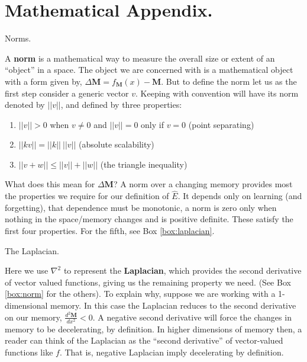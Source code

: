 \section*{Mathematical Appendix.}
\newcommand{\beginsupplement}{%
        \setcounter{table}{0}
        \renewcommand{\thetable}{S\arabic{table}}%
        \setcounter{figure}{0}
        \renewcommand{\thefigure}{S\arabic{figure}}%
     }
\beginsupplement
\setcounter{theorem}{0}

\begin{featurebox}
	\caption{Norms.}
	\label{box:norm}
	A \textbf{norm} is a mathematical way to measure the overall size or extent of an ``object'' in a space. The object we are concerned with is a mathematical object with a form given by, $\Delta \mathbf{M} = f_{\mathbf{M}}(x) - \mathbf{M}$. But to define the norm let us as the first step consider a generic vector $v$. Keeping with convention will have its norm denoted by $||v||$, and defined by three properties:
	
	\begin{enumerate}
	  \item $||v|| > 0$ when $v \neq 0$ and $||v|| = 0$ only if $v=0$ (point separating)
	  \item $||k v|| = ||k||\ ||v||$ (absolute scalability)
	  \item $||v + w|| \leq ||v|| + ||w||$ (the triangle inequality)
	\end{enumerate}
	
	What does this mean for $\Delta \mathbf{M}$? A norm over a changing memory provides most the properties we require for our definition of $\hat E$. It depends only on learning (and forgetting), that dependence must be monotonic, a norm is zero only when nothing in the space/memory changes and is positive definite. These satisfy the first four properties. For the fifth, see Box \ref{box:laplacian}.
	\medskip
	\end{featurebox}
	
	\begin{featurebox}
		\caption{The Laplacian.}
		\label{box:laplacian}
		Here we use $\nabla^2$ to represent the \textbf{Laplacian}, which provides the second derivative of vector valued functions, giving us the remaining property we need. (See Box \ref{box:norm} for the others). To explain why, suppose we are working with a 1- dimensional memory. In this case the Laplacian reduces to the second derivative on our memory, $\frac{d^2\mathbf{M}}{dx^2} < 0$. A negative second derivative will force the changes in memory to be decelerating, by definition. In higher dimensions of memory then, a reader can think of the Laplacian as the ``second derivative'' of vector-valued functions like $f$. That is, negative Laplacian imply decelerating by definition.
		\medskip
	\end{featurebox}

